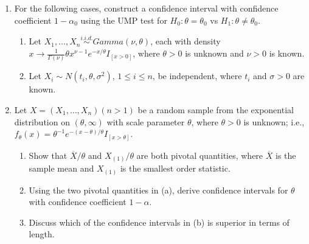 \begin{enumerate}
    \item For the following cases, construct a confidence interval with confidence coefficient \(1 - \alpha_0\) using the UMP test for \(H_0: \theta = \theta_0\) vs \(H_1: \theta \neq \theta_0\).
    \begin{enumerate}
        \item Let \(X_1, \ldots, X_n \overset{i.i.d.}{\sim} Gamma(\nu, \theta)\), each with density \(x \to \frac{1}{\Gamma(\nu)} \theta x^{\nu - 1} e^{-x/\theta} I_{[x > 0]}\), where \(\theta > 0\) is unknown and \(\nu > 0\) is known.
        \item Let \(X_i \sim N(t_i, \theta, \sigma^2)\), \(1 \leq i \leq n\), be independent, where \(t_i\) and \(\sigma > 0\) are known.
    \end{enumerate}

    \item Let \(X = (X_1, \ldots, X_n) (n > 1)\) be a random sample from the exponential distribution on \((\theta, \infty)\) with scale parameter \(\theta\), where \(\theta > 0\) is unknown; i.e., \(f_\theta(x) = \theta^{-1} e^{-(x-\theta)/\theta} I_{[x > \theta]}\).
    \begin{enumerate}
        \item Show that \(\overline{X} / \theta\) and \(X_{(1)} / \theta\) are both pivotal quantities, where \(\overline{X}\) is the sample mean and \(X_{(1)}\) is the smallest order statistic.
        \item Using the two pivotal quantities in (a), derive confidence intervals for \(\theta\) with confidence coefficient \(1 - \alpha\).
        \item Discuss which of the confidence intervals in (b) is superior in terms of length.
    \end{enumerate}
\end{enumerate}